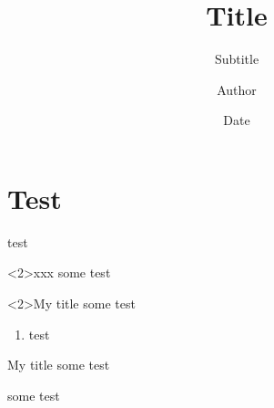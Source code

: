 \documentclass[
]{beamer}
\title{Title}
\author{Author}
\subtitle{Subtitle}
\date{Date}
\institute{Insitute}
\begin{document}
\begin{frame}[t,plain]
\titlepage
\end{frame}

\section{Test}

    
\begin{frame}[t]

  test

  \begin{block}<2>{xxx}
  some test
  \end{block}  

  \begin{alertblock}<2>{My title}
  some test
  \begin{enumerate}
  \item test
  \end{enumerate}
  \end{alertblock}  
  
  \begin{exampleblock}{My title}
  some test
  \end{exampleblock}      
  
  \begin{theorem}[Quack]
  some test
  \end{theorem}        

\end{frame} 
\end{document}

